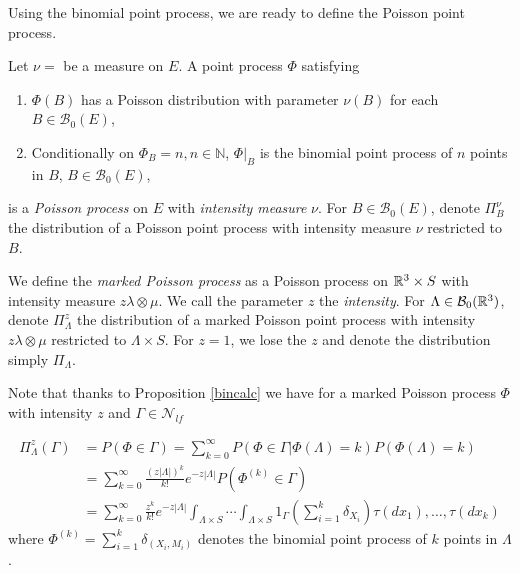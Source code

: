 Using the binomial point process, we are ready to define the Poisson point process. 

\begin{definition} Let $\nu=$ be a measure on $E$. A point process $\Phi$ satisfying
\begin{enumerate}
	\item $\Phi(B)$ has a Poisson distribution with parameter $\nu(B)$ for each $B\in \mathcal B_0(E)$,
	\item Conditionally on $\Phi_B=n, n\in\mathbb N$,  $\Phi|_B$ is the binomial point process of $n$ points in $B$, $B \in \mathcal B_0(E)$,
\end{enumerate}
is a \textit{Poisson process} on $E$ with \textit{intensity measure} $\nu$.
For $B\in \mathcal B_0(E)$, denote $\Pi^\nu_B$ the distribution of a Poisson point process with intensity measure $\nu$ restricted to $B$.  
\end{definition}

\begin{definition}We define the \textit{marked Poisson process} as a Poisson process on ${\mathbb R^3}\times S$ with intensity measure $z\lambda \otimes \mu$. We call the parameter $z$ the \textit{intensity}.\newline
	For $\Lambda\in \mathcal B_0({\mathbb R^3})$, denote $\Pi^z_\Lambda$ the distribution of a marked Poisson point process with intensity $z\lambda \otimes \mu$ restricted to $\Lambda\times S$. For $z=1$, we lose the $z$ and denote the distribution simply $\Pi_\Lambda$.
\end{definition}


Note that thanks to Proposition \ref{bincalc} we have for a marked Poisson process $\Phi$ with intensity $z$ and $\Gamma \in \mathcal N_{lf}$ 

\begin{align}\label{eq:poiscalc}
	\Pi^z_\Lambda(\Gamma) &= P(\Phi \in \Gamma) = \sum^\infty_{k=0} P(\Phi \in \Gamma | \Phi(\Lambda) = k) P(\Phi(\Lambda)=k) \\
	& = \sum^\infty_{k=0} \frac{(z|\Lambda|)^k}{k!} e^{-z|\Lambda|} P(\Phi^{(k)}\in \Gamma) \nonumber \\ 
	& = \sum^\infty_{k=0} \frac{z^k}{k!} e^{-z|\Lambda|} \int_{\Lambda\times S} \cdots \int_{\Lambda\times S} 1_{\Gamma} \left(\sum^k_{i=1} \delta_{X_i}\right) \tau(dx_1), \dots, \tau(dx_k) \nonumber
\end{align}
where $\Phi^{(k)} = \sum^k_{i=1}\delta_{(X_i,M_i)}$ denotes the binomial point process of $k$ points in $\Lambda$.

